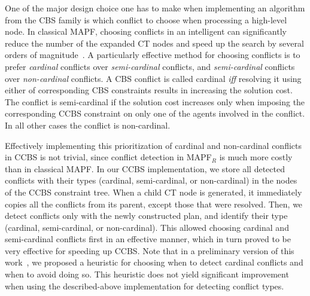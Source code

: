 \documentclass[review]{elsarticle}
\newcommand\konstantin[1]{\nb{\textbf{Konstantin:}}{red}{#1}}
\newcommand\roni[1]{\nb{\textbf{Roni:}}{green}{#1}}
\newcommand{\ccbs}{\ac{CCBS}\xspace}
\newcommand{\cbs}{\ac{CBS}\xspace}
\newcommand{\ct}{\ac{CT}\xspace}
\newcommand{\mapfr}{\ac{MAPF}$_R$\xspace}
\newcommand{\mapf}{\ac{MAPF}\xspace}
\begin{document}
One of the major design choice one has to make when implementing an algorithm from the \cbs family is which conflict to choose when processing a high-level node. 
In classical \mapf, choosing conflicts in an intelligent can significantly reduce the number of the expanded \ct nodes and speed up the search by several orders of magnitude~\cite{boyarski2015icbs,boyrasky2015don}.
A particularly effective method for choosing conflicts is to prefer \emph{cardinal} conflicts over \emph{semi-cardinal} conflicts, and \emph{semi-cardinal} conflicts over \emph{non-cardinal} conflicts. 
A \cbs conflict is called cardinal \emph{iff} resolving it using either of corresponding \cbs constraints results in increasing the solution cost. 
The conflict is semi-cardinal if the solution cost increases only when imposing the corresponding \ccbs constraint on only one of the agents involved in the conflict. In all other cases the conflict is non-cardinal.

Effectively implementing this prioritization of cardinal and non-cardinal conflicts in \ccbs is not trivial, since conflict detection in \mapfr is much more costly than in classical \mapf. 
In our \ccbs implementation, we store all detected conflicts with their types (cardinal, semi-cardinal, or non-cardinal) in the nodes of the \ccbs constraint tree. 
When a child \ct node is generated, it immediately copies all the conflicts from its parent, except those that were resolved. Then, we detect conflicts only with the newly constructed plan, and identify their type (cardinal, semi-cardinal, or non-cardinal). This allowed choosing cardinal and semi-cardinal conflicts first in an effective manner, which in turn proved to be very effective for speeding up \ccbs. 
Note that in a preliminary version of this work~\cite{andreychuk2019multi}, we proposed a heuristic for choosing when to detect cardinal conflicts and when to avoid doing so. This heuristic does not yield significant improvement when using the described-above implementation for detecting conflict types. 
\end{document}
